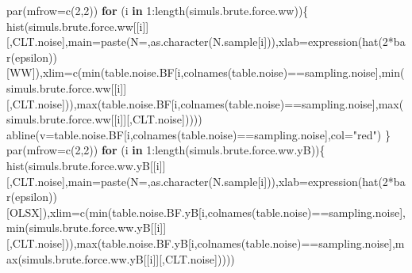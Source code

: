 \documentclass[
]{book}
\newenvironment{Shaded}{\begin{snugshade}}{\end{snugshade}}
\newcommand{\AttributeTok}[1]{\textcolor[rgb]{0.77,0.63,0.00}{#1}}
\newcommand{\ControlFlowTok}[1]{\textcolor[rgb]{0.13,0.29,0.53}{\textbf{#1}}}
\newcommand{\DecValTok}[1]{\textcolor[rgb]{0.00,0.00,0.81}{#1}}
\newcommand{\FunctionTok}[1]{\textcolor[rgb]{0.00,0.00,0.00}{#1}}
\newcommand{\NormalTok}[1]{#1}
\newcommand{\SpecialCharTok}[1]{\textcolor[rgb]{0.00,0.00,0.00}{#1}}
\newcommand{\StringTok}[1]{\textcolor[rgb]{0.31,0.60,0.02}{#1}}
\theoremstyle{definition}
\theoremstyle{definition}
\theoremstyle{definition}
\theoremstyle{definition}
\theoremstyle{remark}
\begin{document}
\begin{Shaded}
\begin{Highlighting}[]
\FunctionTok{par}\NormalTok{(}\AttributeTok{mfrow=}\FunctionTok{c}\NormalTok{(}\DecValTok{2}\NormalTok{,}\DecValTok{2}\NormalTok{))}
\ControlFlowTok{for}\NormalTok{ (i }\ControlFlowTok{in} \DecValTok{1}\SpecialCharTok{:}\FunctionTok{length}\NormalTok{(simuls.brute.force.ww))\{}
  \FunctionTok{hist}\NormalTok{(simuls.brute.force.ww[[i]][,}\StringTok{\textquotesingle{}CLT.noise\textquotesingle{}}\NormalTok{],}\AttributeTok{main=}\FunctionTok{paste}\NormalTok{(}\StringTok{\textquotesingle{}N=\textquotesingle{}}\NormalTok{,}\FunctionTok{as.character}\NormalTok{(N.sample[i])),}\AttributeTok{xlab=}\FunctionTok{expression}\NormalTok{(}\FunctionTok{hat}\NormalTok{(}\DecValTok{2}\SpecialCharTok{*}\FunctionTok{bar}\NormalTok{(epsilon))[WW]),}\AttributeTok{xlim=}\FunctionTok{c}\NormalTok{(}\FunctionTok{min}\NormalTok{(table.noise.BF[i,}\FunctionTok{colnames}\NormalTok{(table.noise)}\SpecialCharTok{==}\StringTok{\textquotesingle{}sampling.noise\textquotesingle{}}\NormalTok{],}\FunctionTok{min}\NormalTok{(simuls.brute.force.ww[[i]][,}\StringTok{\textquotesingle{}CLT.noise\textquotesingle{}}\NormalTok{])),}\FunctionTok{max}\NormalTok{(table.noise.BF[i,}\FunctionTok{colnames}\NormalTok{(table.noise)}\SpecialCharTok{==}\StringTok{\textquotesingle{}sampling.noise\textquotesingle{}}\NormalTok{],}\FunctionTok{max}\NormalTok{(simuls.brute.force.ww[[i]][,}\StringTok{\textquotesingle{}CLT.noise\textquotesingle{}}\NormalTok{]))))}
  \FunctionTok{abline}\NormalTok{(}\AttributeTok{v=}\NormalTok{table.noise.BF[i,}\FunctionTok{colnames}\NormalTok{(table.noise)}\SpecialCharTok{==}\StringTok{\textquotesingle{}sampling.noise\textquotesingle{}}\NormalTok{],}\AttributeTok{col=}\StringTok{"red"}\NormalTok{)}
\NormalTok{\}}
\FunctionTok{par}\NormalTok{(}\AttributeTok{mfrow=}\FunctionTok{c}\NormalTok{(}\DecValTok{2}\NormalTok{,}\DecValTok{2}\NormalTok{))}
\ControlFlowTok{for}\NormalTok{ (i }\ControlFlowTok{in} \DecValTok{1}\SpecialCharTok{:}\FunctionTok{length}\NormalTok{(simuls.brute.force.ww.yB))\{}
  \FunctionTok{hist}\NormalTok{(simuls.brute.force.ww.yB[[i]][,}\StringTok{\textquotesingle{}CLT.noise\textquotesingle{}}\NormalTok{],}\AttributeTok{main=}\FunctionTok{paste}\NormalTok{(}\StringTok{\textquotesingle{}N=\textquotesingle{}}\NormalTok{,}\FunctionTok{as.character}\NormalTok{(N.sample[i])),}\AttributeTok{xlab=}\FunctionTok{expression}\NormalTok{(}\FunctionTok{hat}\NormalTok{(}\DecValTok{2}\SpecialCharTok{*}\FunctionTok{bar}\NormalTok{(epsilon))[OLSX]),}\AttributeTok{xlim=}\FunctionTok{c}\NormalTok{(}\FunctionTok{min}\NormalTok{(table.noise.BF.yB[i,}\FunctionTok{colnames}\NormalTok{(table.noise)}\SpecialCharTok{==}\StringTok{\textquotesingle{}sampling.noise\textquotesingle{}}\NormalTok{],}\FunctionTok{min}\NormalTok{(simuls.brute.force.ww.yB[[i]][,}\StringTok{\textquotesingle{}CLT.noise\textquotesingle{}}\NormalTok{])),}\FunctionTok{max}\NormalTok{(table.noise.BF.yB[i,}\FunctionTok{colnames}\NormalTok{(table.noise)}\SpecialCharTok{==}\StringTok{\textquotesingle{}sampling.noise\textquotesingle{}}\NormalTok{],}\FunctionTok{max}\NormalTok{(simuls.brute.force.ww.yB[[i]][,}\StringTok{\textquotesingle{}CLT.noise\textquotesingle{}}\NormalTok{]))))}

\end{Highlighting}
\end{Shaded}
\end{document}

